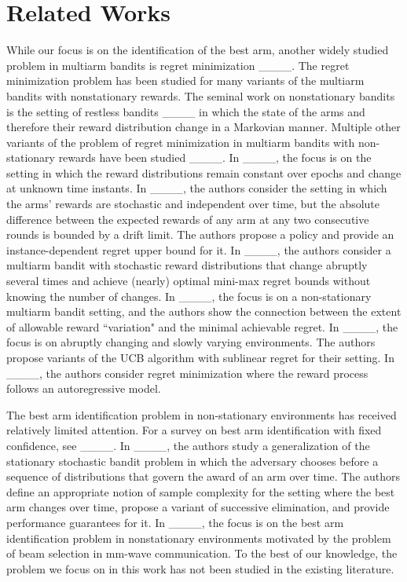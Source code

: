 \section{Related Works}
While our focus is on the identification of the best arm, another widely studied problem in multiarm bandits is regret minimization ____. The regret minimization problem has been studied for many variants of the multiarm bandits with nonstationary rewards. The seminal work on nonstationary bandits is the setting of restless bandits ____ in which the state of the arms and therefore their reward distribution change in a Markovian manner. Multiple other variants of the problem of regret minimization in multiarm bandits with non-stationary rewards have been studied ____. In ____, the focus is on the setting in which the reward distributions remain constant over epochs and change at unknown time instants. In ____, the authors consider the setting in which the arms' rewards are stochastic and independent over time, but the absolute difference between the expected rewards of any arm at any two consecutive rounds is bounded by a drift limit. The authors propose a policy and provide an instance-dependent regret upper bound for it. In ____, the authors consider a multiarm bandit with stochastic reward
distributions that change abruptly several times and achieve (nearly) optimal mini-max regret bounds without knowing the number of changes. In ____, the focus is on a non-stationary multiarm bandit setting, and the authors show the connection between the extent
of allowable reward ``variation" and the minimal achievable regret. In ____, the focus is on abruptly changing and slowly varying environments. The authors propose variants of the UCB algorithm with sublinear regret for their setting. In ____, the authors consider regret minimization where the reward process follows an autoregressive model.

The best arm identification problem in non-stationary environments has received relatively limited attention. For a survey on  best arm identification with fixed confidence, see ____. In ____, the authors study a generalization of the stationary stochastic bandit problem in which the adversary chooses before a sequence of distributions that govern the award of an arm over time. The authors define an appropriate notion of sample complexity for the setting where the best arm changes over time, propose a variant of successive elimination, and provide performance guarantees for it. In ____, the focus is on the best arm identification problem in nonstationary environments motivated by the problem of beam selection in mm-wave communication. To the best of our knowledge, the problem we focus on in this work has not been studied in the existing literature. 
\color{black}